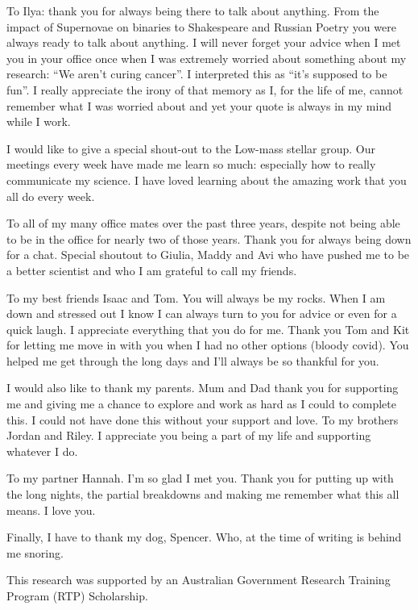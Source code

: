 {To Ilya: thank you for always being there to talk about anything. From the impact of Supernovae on binaries to Shakespeare and Russian Poetry you were always ready to talk about anything. I will never forget your advice when I met you in your office once when I was extremely worried about something about my research: “We aren’t curing cancer”. I interpreted this as “it’s supposed to be fun”. I really appreciate the irony of that memory as I, for the life of me, cannot remember what I was worried about and yet your quote is always in my mind while I work.

I would like to give a special shout-out to the Low-mass stellar group. Our meetings every week have made me learn so much: especially how to really communicate my science. I have loved learning about the amazing work that you all do every week.

To all of my many office mates over the past three years, despite not being able to be in the office for nearly two of those years. Thank you for always being down for a chat. Special shoutout to Giulia, Maddy and Avi who have pushed me to be a better scientist and who I am grateful to call my friends.

To my best friends Isaac and Tom. You will always be my rocks. When I am down and stressed out I know I can always turn to you for advice or even for a quick laugh. I appreciate everything that you do for me. Thank you Tom and Kit for letting me move in with you when I had no other options (bloody covid). You helped me get through the long days and I’ll always be so thankful for you. 

I would also like to thank my parents. Mum and Dad thank you for supporting me and giving me a chance to explore and work as hard as I could to complete this. I could not have done this without your support and love. To my brothers Jordan and Riley. I appreciate you being a part of my life and supporting whatever I do.

To my partner Hannah. I’m so glad I met you. Thank you for putting up with the long nights, the partial breakdowns and making me remember what this all means. I love you.

Finally, I have to thank my dog, Spencer. Who, at the time of writing is behind me snoring.


This research was supported by an Australian Government Research Training Program (RTP) Scholarship.


}